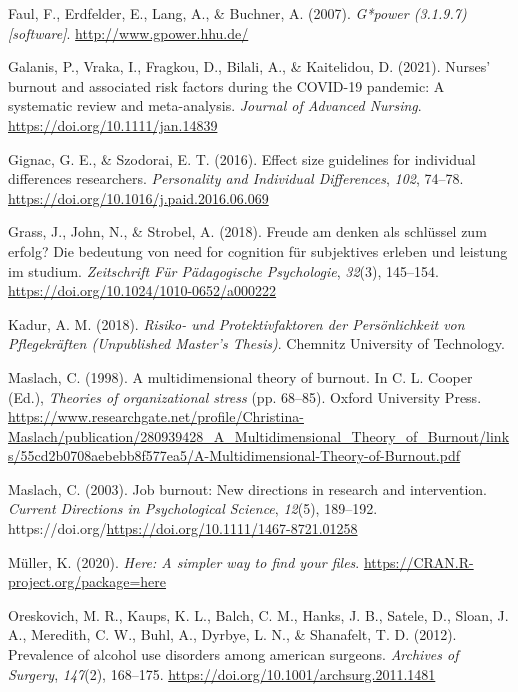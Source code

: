\documentclass[
  man]{apa6}
\newlength{\cslhangindent}
\newenvironment{CSLReferences}[2] %
 {\begin{list}{}{%
  \setlength{\itemindent}{0pt}
  \setlength{\leftmargin}{0pt}
  \setlength{\parsep}{0pt}
  \ifodd #1
   \setlength{\leftmargin}{\cslhangindent}
   \setlength{\itemindent}{-1\cslhangindent}
  \fi
  \setlength{\itemsep}{#2\baselineskip}}}
 {\end{list}}
\begin{document}
\begin{CSLReferences}{1}{0}
Faul, F., Erdfelder, E., Lang, A., \& Buchner, A. (2007). \emph{G*power (3.1.9.7) {[}software{]}}. \url{http://www.gpower.hhu.de/}

Galanis, P., Vraka, I., Fragkou, D., Bilali, A., \& Kaitelidou, D. (2021). Nurses' burnout and associated risk factors during the COVID-19 pandemic: A systematic review and meta-analysis. \emph{Journal of Advanced Nursing}. \url{https://doi.org/10.1111/jan.14839}

Gignac, G. E., \& Szodorai, E. T. (2016). Effect size guidelines for individual differences researchers. \emph{Personality and Individual Differences}, \emph{102}, 74--78. \url{https://doi.org/10.1016/j.paid.2016.06.069}

Grass, J., John, N., \& Strobel, A. (2018). Freude am denken als schlüssel zum erfolg? Die bedeutung von need for cognition für subjektives erleben und leistung im studium. \emph{Zeitschrift Für Pädagogische Psychologie}, \emph{32}(3), 145--154. \url{https://doi.org/10.1024/1010-0652/a000222}

Kadur, A. M. (2018). \emph{{Risiko}- und {Protektivfaktoren} der {Persönlichkeit} von {Pflegekräften} ({Unpublished Master's Thesis})}. Chemnitz University of Technology.

Maslach, C. (1998). A multidimensional theory of burnout. In C. L. Cooper (Ed.), \emph{Theories of organizational stress} (pp. 68--85). Oxford University Press. \url{https://www.researchgate.net/profile/Christina-Maslach/publication/280939428_A_Multidimensional_Theory_of_Burnout/links/55cd2b0708aebebb8f577ea5/A-Multidimensional-Theory-of-Burnout.pdf}

Maslach, C. (2003). Job burnout: New directions in research and intervention. \emph{Current Directions in Psychological Science}, \emph{12}(5), 189--192. https://doi.org/\url{https://doi.org/10.1111/1467-8721.01258}

Müller, K. (2020). \emph{Here: A simpler way to find your files}. \url{https://CRAN.R-project.org/package=here}

Oreskovich, M. R., Kaups, K. L., Balch, C. M., Hanks, J. B., Satele, D., Sloan, J. A., Meredith, C. W., Buhl, A., Dyrbye, L. N., \& Shanafelt, T. D. (2012). Prevalence of alcohol use disorders among american surgeons. \emph{Archives of Surgery}, \emph{147}(2), 168--175. \url{https://doi.org/10.1001/archsurg.2011.1481}


\end{CSLReferences}
\end{document}
